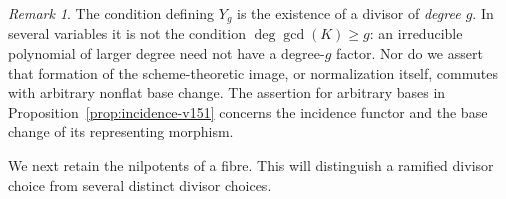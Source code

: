 \documentclass[11pt,reqno]{amsart}
\numberwithin{equation}{section}
\theoremstyle{definition}\newtheorem{definition}[theorem]{Definition}
\theoremstyle{remark}\newtheorem{remark}[theorem]{Remark}
\begin{document}
\begin{remark}\label{rem:degree-divisor-v151}
The condition defining \(Y_g\) is the existence of a divisor of
\emph{degree \(g\)}.  In several variables it is not the condition
\(\deg\gcd(K)\geq g\): an irreducible polynomial of larger degree
need not have a degree-\(g\) factor.  Nor do we assert that formation
of the scheme-theoretic image, or normalization itself, commutes with
arbitrary nonflat base change.  The assertion for arbitrary bases in
Proposition~\ref{prop:incidence-v151} concerns the incidence functor
and the base change of its representing morphism.
\end{remark}

We next retain the nilpotents of a fibre.  This will distinguish a
ramified divisor choice from several distinct divisor choices.
\end{document}
